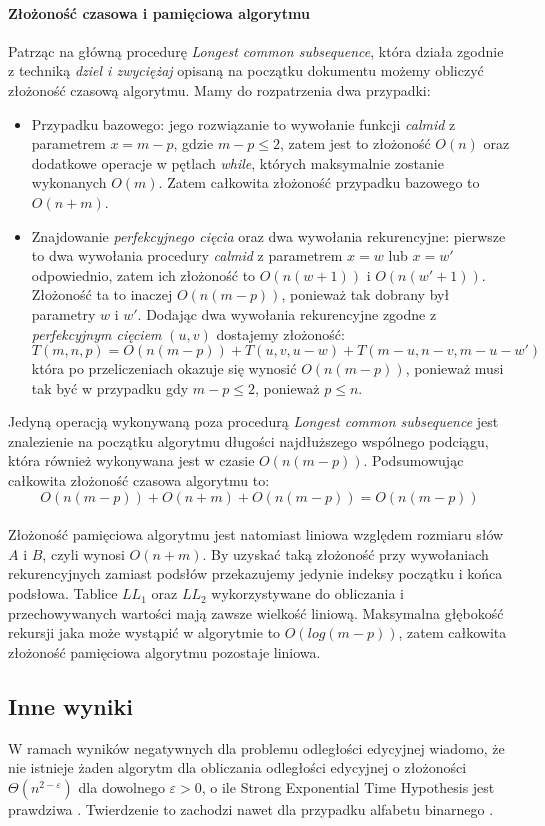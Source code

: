 \paragraph{Złożoność czasowa i pamięciowa algorytmu}
Patrząc na główną procedurę \textit{Longest common subsequence}, która działa zgodnie z techniką \textit{dziel i zwyciężaj} opisaną na początku dokumentu możemy obliczyć złożoność czasową algorytmu.
Mamy do rozpatrzenia dwa przypadki:
\begin{itemize}
    \item Przypadku bazowego: jego rozwiązanie to wywołanie funkcji \textit{calmid} z parametrem $x = m-p$, gdzie $m - p \leq 2$, zatem jest to złożoność $O(n)$ oraz dodatkowe operacje w pętlach \textit{while}, których maksymalnie zostanie wykonanych $O(m)$. Zatem całkowita złożoność przypadku bazowego to $O(n + m)$.
    \item Znajdowanie \textit{perfekcyjnego cięcia} oraz dwa wywołania rekurencyjne: pierwsze to dwa wywołania procedury \textit{calmid} z parametrem $x = w$ lub $x = w'$ odpowiednio, zatem ich złożoność to $O(n(w + 1))$ i $O(n(w' + 1))$. Złożoność ta to inaczej $O(n(m - p))$, ponieważ tak dobrany był parametry $w$ i $w'$. Dodając dwa wywołania rekurencyjne zgodne z \textit{perfekcyjnym cięciem} $(u, v)$ dostajemy złożoność:
    \[
        T(m, n, p) = O(n(m - p)) + T(u, v, u - w) + T(m - u, n - v, m - u - w')
    \]
    która po przeliczeniach okazuje się wynosić $O(n(m - p))$, ponieważ musi tak być w przypadku gdy $m-p \leq 2$, ponieważ $p \leq n$.
\end{itemize}
Jedyną operacją wykonywaną poza procedurą \textit{Longest common subsequence} jest znalezienie na początku algorytmu długości najdłuższego wspólnego podciągu, która również wykonywana jest w czasie $O(n(m - p))$.
Podsumowując całkowita złożoność czasowa algorytmu to:
\[
O(n(m - p)) + O(n + m) + O(n(m - p)) = O(n(m - p))
\]\\
Złożoność pamięciowa algorytmu jest natomiast liniowa względem rozmiaru słów $A$ i $B$, czyli wynosi $O(n + m)$. By uzyskać taką złożoność przy wywołaniach rekurencyjnych zamiast podsłów przekazujemy jedynie indeksy początku i końca podsłowa. Tablice $LL_1$ oraz $LL_2$ wykorzystywane do obliczania i przechowywanych wartości mają zawsze wielkość liniową. Maksymalna głębokość rekursji jaka może wystąpić w algorytmie to $O(log(m-p))$, zatem całkowita złożoność pamięciowa algorytmu pozostaje liniowa.

\subsection{Inne wyniki}

W ramach wyników negatywnych dla problemu odległości edycyjnej wiadomo, że nie istnieje żaden algorytm dla obliczania odległości edycyjnej o złożoności $\Theta(n^{2 - \varepsilon})$ dla dowolnego $\varepsilon > 0$, o ile Strong Exponential Time Hypothesis jest prawdziwa \citep{backurs2015edit}. Twierdzenie to zachodzi nawet dla przypadku alfabetu binarnego \citep{bringmann2015quadratic}.


